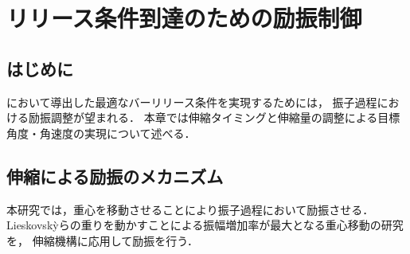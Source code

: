 \chapter[リリース条件到達のための励振制御]%
{リリース条件到達のための励振制御}
        \section{はじめに}

        において導出した最適なバーリリース条件を実現するためには，
        振子過程における励振調整が望まれる．
        本章では伸縮タイミングと伸縮量の調整による目標角度・角速度の実現について述べる．
          
        \section{伸縮による励振のメカニズム}

          本研究では，重心を移動させることにより振子過程において励振させる．
          Lieskovsk{\`y}らの重りを動かすことによる振幅増加率が最大となる重心移動の研究\cite{lieskovsky2023optimal}を，
          伸縮機構に応用して励振を行う．
          
